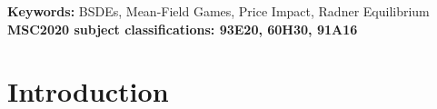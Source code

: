 \documentclass[10pt,a4paper]{article}
\theoremstyle{plain}
\theoremstyle{definition}
\numberwithin{equation}{section}
\begin{document}
\begin{abstract}
\end{abstract}
 


\textbf{Keywords:} BSDEs, Mean-Field Games, Price Impact, Radner Equilibrium\\

\textbf{MSC2020 subject classifications: 93E20, 60H30, 91A16}


\section{Introduction}
\label{sec1}







\end{document}
